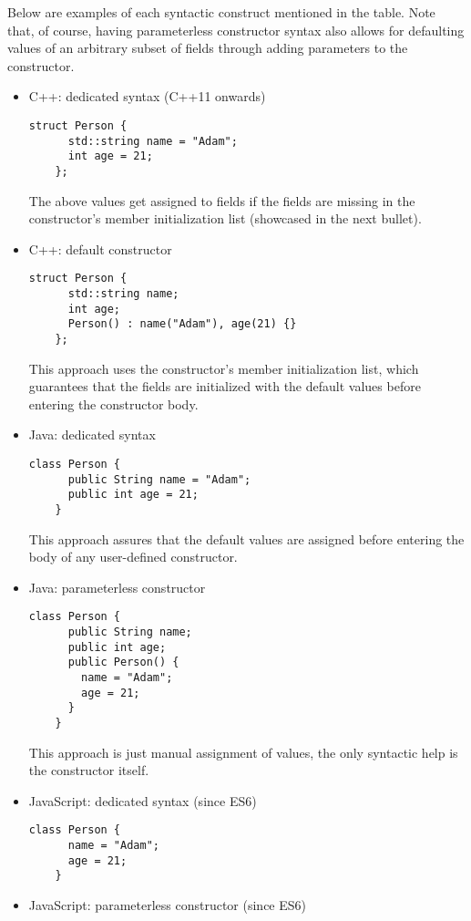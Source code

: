 \documentclass[en]{pracamgr}
\begin{document}
Below are examples of each syntactic construct mentioned in the table. 
Note that, of course, having parameterless constructor syntax also allows for defaulting values
of an arbitrary subset of fields through adding parameters to the constructor.
\begin{itemize}
  \item C++: dedicated syntax (C++11 onwards) \cite{Cpp11}
  \begin{lstlisting}[style=cpp]
    struct Person {
      std::string name = "Adam";
      int age = 21;
    };
  \end{lstlisting}
  The above values get assigned to fields if the fields are missing in the 
  constructor's member initialization list (showcased in the next bullet).
  \item C++: default constructor \cite{Cpp98}
  \begin{lstlisting}[style=cpp]
    struct Person {
      std::string name;
      int age;
      Person() : name("Adam"), age(21) {}
    };
  \end{lstlisting}
  This approach uses the constructor's member initialization list, which guarantees that the fields are initialized
  with the default values before entering the constructor body.
  \item Java: dedicated syntax
  \begin{lstlisting}[style=Java]
    class Person {
      public String name = "Adam";
      public int age = 21;
    }
  \end{lstlisting}
  This approach assures that the default values are assigned before entering the body of any user-defined constructor.
  \item Java: parameterless constructor
  \begin{lstlisting}[style=Java]
    class Person {
      public String name;
      public int age;
      public Person() {
        name = "Adam";
        age = 21;
      }
    }
  \end{lstlisting}
  This approach is just manual assignment of values, the only syntactic help is the constructor itself.
  \item JavaScript: dedicated syntax (since ES6)
  \begin{lstlisting}[style=JavaScript]
    class Person {
      name = "Adam";
      age = 21;
    }
  \end{lstlisting}
  \item JavaScript: parameterless constructor (since ES6)
  \begin{lstlisting}[style=JavaScript]

\end{lstlisting}
\end{itemize}
\end{document}
